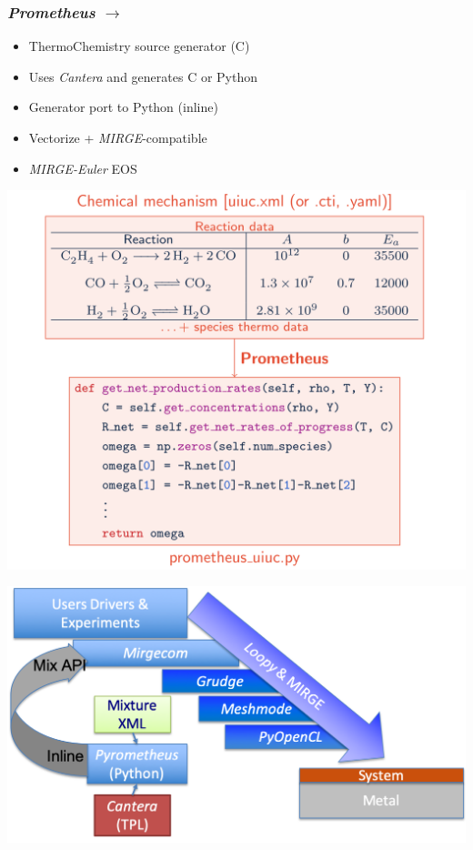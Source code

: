 \begin{frame}\frametitle{\textit{Prometheus} $\rightarrow$ \pyrometheus}
  \begin{multicols}{2}
      \begin{itemize}
      \item ThermoChemistry source generator (C\plusplus{})
      \item Uses \textit{Cantera} and generates C\plusplus{} or Python
      \end{itemize}
      \columnbreak
      \begin{itemize}
      \item Generator port to Python (inline)
      \item Vectorize + \textit{MIRGE}-compatible
      \item \textit{MIRGE-Euler} EOS
      \end{itemize}
  \end{multicols}
  \begin{multicols}{2}
    \includegraphics[width=.5\textwidth]{figures/mtc/Prometheus2.png}\\
    \begin{center}
    \end{center}
      \columnbreak
      \vspace{10pt}
    \includegraphics[width=.5\textwidth]{figures/mtc/PyrometheusIntegration.png}    
  \end{multicols}
\end{frame}

